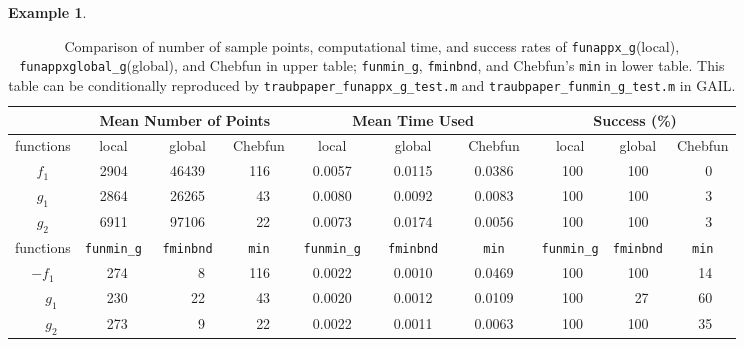\documentclass[review]{elsarticle}
\theoremstyle{definition}
\newtheorem{exmp}{Example}
\newcommand{\funappxg}{\texttt{funappx\_g}\xspace}
\newcommand{\funappxglobalg}{\texttt{funappxglobal\_g}\xspace}
\newcommand{\funming}{\texttt{funmin\_g}\xspace}
\newcommand{\fminbnd}{\texttt{fminbnd}\xspace}
\begin{document}
\begin{exmp}
%

%
\begin{table}[bt]
\centering
\caption{Comparison of number of sample points, computational time,  and success
rates of \funappxg (local), \funappxglobalg (global), and Chebfun in upper table;
\funming, \fminbnd, and Chebfun's \texttt{min} in lower table.
This table can be conditionally reproduced by
\texttt{traubpaper\_funappx\_g\_test.m} and \texttt{traubpaper\_funmin\_g\_test.m}  in GAIL.}
\label{tab:localVsGlobalVsChebfun}
{\footnotesize
\setlength{\tabcolsep}{.15 em} %
		\begin{tabular}{ccrccrccrccrccrccrccrccrccrc}	
		 \hline	
			               &    \multicolumn{9}{c}{\bf Mean Number of Points}   & \multicolumn{9}{c}{\bf Mean Time Used}  & \multicolumn{9}{c}{\bf Success (\%)}
	  \\ \hline  functions &  \multicolumn{3}{c}{local}  &  \multicolumn{3}{c}{global }  &  \multicolumn{3}{c}{Chebfun }  & \multicolumn{3}{c}{local}  &  \multicolumn{3}{c}{global }  &  \multicolumn{3}{c}{Chebfun } & \multicolumn{3}{c}{local}  &  \multicolumn{3}{c}{global }  &  \multicolumn{3}{c}{Chebfun }
\\ \toprule
          $f_1$   &&   2904  &&&   46439   &&&   116    &&&   0.0057   &&&     0.0115    &&&   0.0386 &&&    100   &&&  100   &&&  0
\\        $g_1$   &&   2864  &&&   26265   &&&    43    &&&   0.0080   &&&     0.0092    &&&   0.0083 &&&    100   &&&  100   &&&  3
\\        $g_2$   &&   6911  &&&   97106   &&&    22    &&&   0.0073   &&&     0.0174    &&&   0.0056 &&&    100   &&&  100    &&&  3  	
\\ \hline

			 functions &  \multicolumn{3}{c}{\funming} &  \multicolumn{3}{c}{\fminbnd}  &  \multicolumn{3}{c}{\texttt{min}}
		  &  \multicolumn{3}{c}{\funming}  &  \multicolumn{3}{c}{\fminbnd }  &  \multicolumn{3}{c}{\texttt{min} }  &  \multicolumn{3}{c}{\funming} & \multicolumn{3}{c}{\fminbnd} & \multicolumn{3}{c}{\texttt{min}}
			\\ \toprule
			$-f_1$   &&  274   &&&   8   &&&  116     &&&   0.0022   &&&   0.0010    &&& 0.0469  &&&   100   &&&  100   &&&  14
			\\ $\phantom{-}g_1$   && 230 &&&  22   &&&    43    &&& 0.0020  &&&    0.0012   &&&  0.0109 &&&    100   &&&   27   &&&  60
			\\ $\phantom{-}g_2$   &&  273 &&&   9   &&&   22    &&&  0.0022   &&&   0.0011    &&&  0.0063 &&&    100   &&& 100   &&&  35
			\\ \hline
		\end{tabular}
}
\end{table}
%


\end{exmp}
\end{document}
